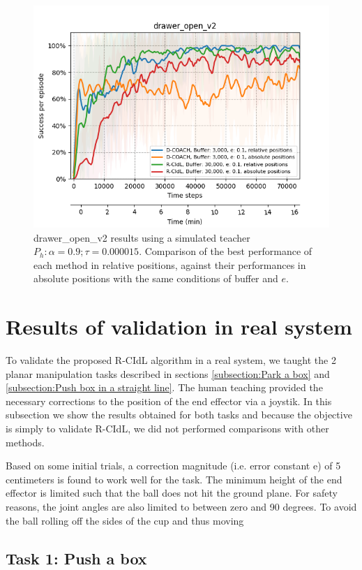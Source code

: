 \begin{figure}[H]
    \centering
    \includegraphics[width=.7\textwidth]{figures/drawer_best.png}
    \caption{drawer\_open\_v2 results using a simulated teacher $P_h: \alpha = 0.9; \tau =  0.000015$. Comparison of the best performance of each method in relative positions, against their performances in absolute positions with the same conditions of buffer and $e$.}
    \label{fig:results_drawer_open_best}
\end{figure}


\section{Results of validation in real system}
\label{section:results_kuka}

To validate the proposed R-CIdL algorithm in a real system, we taught the 2 planar manipulation tasks described in sections \ref{subsection:Park a box} and \ref{subsection:Push box in a straight line}. The human teaching provided the necessary corrections to the position of the end effector via a joystik. In this subsection we show the results obtained for both tasks and because the objective is simply to validate R-CIdL, we did not performed comparisons with other methods. 



 Based on some initial trials, a correction magnitude (i.e. error constant e) of 5 centimeters is found to work well for the task. The minimum height of the end effector is limited such that the ball does not hit the ground plane. For safety reasons, the joint angles are also limited to between zero and 90 degrees. To avoid the ball rolling off the sides of the cup and thus moving

\subsection{Task 1: Push a box}
\label{subsection:results_kuka_push}


